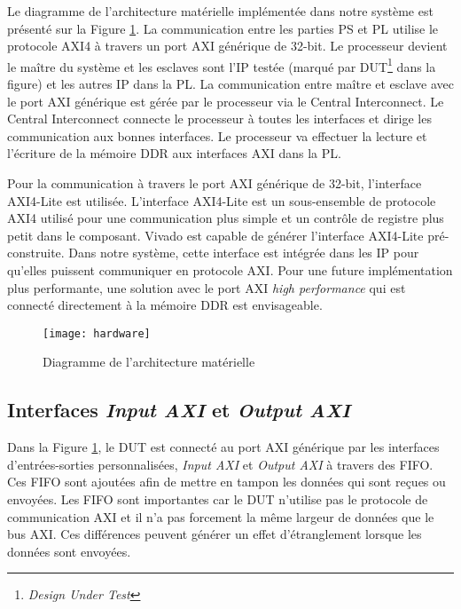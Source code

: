 Le diagramme de l'architecture matérielle implémentée dans notre système est présenté sur la Figure \ref{fig:hard}.
La communication entre les parties PS et PL utilise le protocole AXI4 à travers un port AXI générique
de 32-bit. Le processeur devient le maître du système et les esclaves sont l'IP testée 
(marqué par DUT\footnote{\emph{Design Under Test}} dans la figure) et les autres IP dans la PL.
La communication entre maître et esclave avec le port AXI générique est gérée par le processeur via le Central Interconnect. 
Le Central Interconnect connecte le processeur à toutes les interfaces et dirige
les communication aux bonnes interfaces.
Le processeur va effectuer la lecture et l'écriture de la mémoire DDR aux interfaces AXI dans la PL.

Pour la communication à travers le port AXI générique de 32-bit, l'interface AXI4-Lite est utilisée.
L'interface AXI4-Lite est un sous-ensemble de protocole AXI4 utilisé pour une communication
plus simple et un contrôle de registre plus petit dans le composant. Vivado est capable de générer
l'interface AXI4-Lite pré-construite. Dans notre système, cette interface est
intégrée dans les IP pour qu'elles puissent communiquer en protocole AXI.
Pour une future implémentation plus performante, une solution avec le port AXI \emph{high performance} qui est
connecté directement à la mémoire DDR est envisageable. 

\begin{figure}[h]
	\centering
	\texttt{[image: hardware]}
	\caption{Diagramme de l'architecture matérielle}
	\label{fig:hard}
	\vspace{-2mm}
\end{figure}

\subsection{Interfaces \emph{Input AXI} et \emph{Output AXI}}

Dans la Figure \ref{fig:hard}, le DUT est connecté au port AXI générique par les interfaces d'entrées-sorties personnalisées,
\emph{Input AXI} et \emph{Output AXI} à travers des FIFO. Ces FIFO sont ajoutées
afin de mettre en tampon les données qui sont reçues ou envoyées.
Les FIFO sont importantes car le DUT n'utilise pas le protocole
de communication AXI et il n'a pas forcement la même largeur de données que le bus AXI. 
Ces différences peuvent générer un effet d'étranglement lorsque les données sont envoyées.

